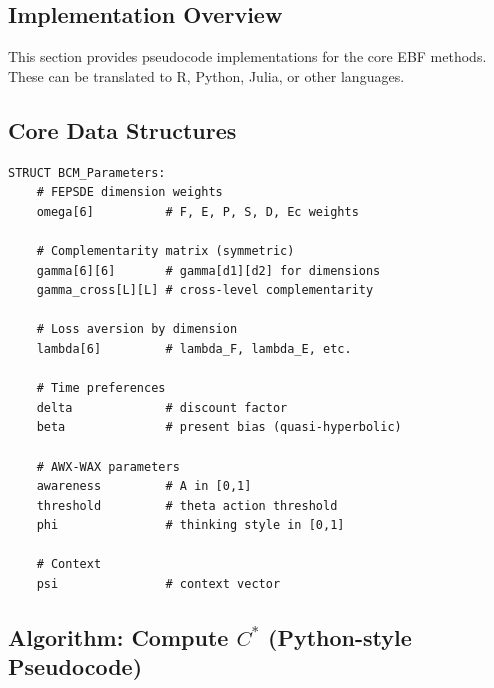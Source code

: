 \subsection{Implementation Overview}

This section provides pseudocode implementations for the core EBF methods.
These can be translated to R, Python, Julia, or other languages.

\subsection{Core Data Structures}

\begin{tcolorbox}[colback=gray!5!white, colframe=gray!75!black,
    title=Data Structure: EBF Parameters]
\begin{verbatim}
STRUCT BCM_Parameters:
    # FEPSDE dimension weights
    omega[6]          # F, E, P, S, D, Ec weights

    # Complementarity matrix (symmetric)
    gamma[6][6]       # gamma[d1][d2] for dimensions
    gamma_cross[L][L] # cross-level complementarity

    # Loss aversion by dimension
    lambda[6]         # lambda_F, lambda_E, etc.

    # Time preferences
    delta             # discount factor
    beta              # present bias (quasi-hyperbolic)

    # AWX-WAX parameters
    awareness         # A in [0,1]
    threshold         # theta action threshold
    phi               # thinking style in [0,1]

    # Context
    psi               # context vector
\end{verbatim}
\end{tcolorbox}

\subsection{Algorithm: Compute $C^*$ (Python-style Pseudocode)}

